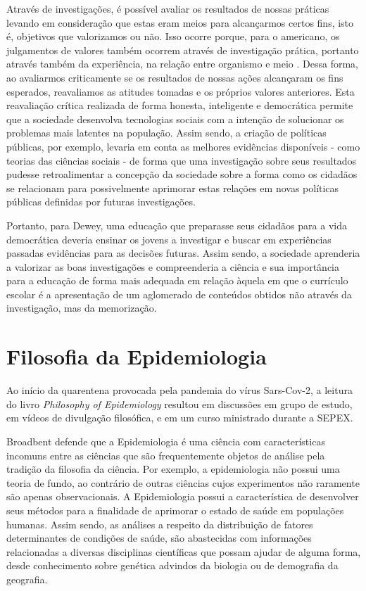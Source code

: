\documentclass[12pt]{report}
\begin{document}
		Através de investigações, é possível avaliar os resultados de nossas práticas levando em consideração que estas eram meios para alcançarmos certos fins, isto é, objetivos que valorizamos ou não.
		Isso ocorre porque, para o americano, os julgamentos de valores também ocorrem através de investigação prática, portanto através também da experiência, na relação entre organismo e meio \cite{dewey_valuation, dewey-en}.
		Dessa forma, ao avaliarmos criticamente se os resultados de nossas ações alcançaram os fins esperados, reavaliamos as atitudes tomadas e os próprios valores anteriores.
		Esta reavaliação crítica realizada de forma honesta, inteligente e democrática permite que a sociedade desenvolva tecnologias sociais com a intenção de solucionar os problemas mais latentes na população.
		Assim sendo, a criação de políticas públicas, por exemplo, levaria em conta as melhores evidências disponíveis - como teorias das ciências sociais - de forma que uma investigação sobre seus resultados pudesse retroalimentar a concepção da sociedade sobre a forma como os cidadãos se relacionam para possivelmente aprimorar estas relações em novas políticas públicas definidas por futuras investigações.
		
		Portanto, para Dewey, uma educação que preparasse seus cidadãos para a vida democrática deveria ensinar os jovens a investigar e buscar em experiências passadas evidências para as decisões futuras.
		Assim sendo, a sociedade aprenderia a valorizar as boas investigações e compreenderia a ciência e sua importância para a educação de forma mais adequada em relação àquela em que o currículo escolar é a apresentação de um aglomerado de conteúdos obtidos não através da investigação, mas da memorização.
	
	\section{Filosofia da Epidemiologia}
	
	 	Ao início da quarentena provocada pela pandemia do vírus Sars-Cov-2, a leitura do livro \textit{Philosophy of Epidemiology} \cite{broadbent} resultou em discussões em grupo de estudo, em vídeos de divulgação filosófica, e em um curso ministrado durante a SEPEX.
	 	
	 	Broadbent defende que a Epidemiologia é uma ciência com características incomuns entre as ciências que são frequentemente objetos de análise pela tradição da filosofia da ciência.
		Por exemplo, a epidemiologia não possui uma teoria de fundo, ao contrário de outras ciências cujos experimentos não raramente são apenas observacionais.
		A Epidemiologia possui a característica de desenvolver seus métodos para a finalidade de aprimorar o estado de saúde em populações humanas.
		Assim sendo, as análises a respeito da distribuição de fatores determinantes de condições de saúde, são abastecidas com informações relacionadas a diversas disciplinas científicas que possam ajudar de alguma forma, desde conhecimento sobre genética advindos da biologia ou de demografia da geografia.
	 	
\end{document}
